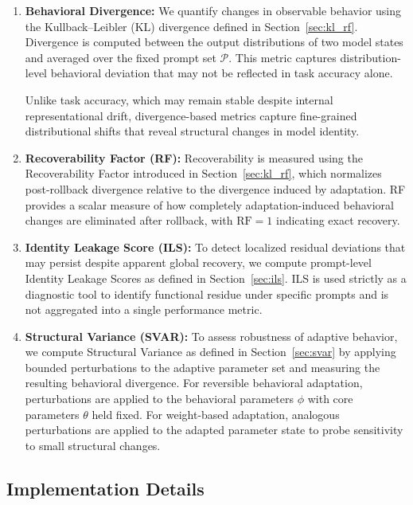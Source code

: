 \documentclass[10pt]{article}
\begin{document}
	\begin{enumerate}
		\item \textbf{Behavioral Divergence:}
		We quantify changes in observable behavior using the Kullback--Leibler (KL) divergence defined in Section~\ref{sec:kl_rf}. Divergence is computed between the output distributions of two model states and averaged over the fixed prompt set $\mathcal{P}$. This metric captures distribution-level behavioral deviation that may not be reflected in task accuracy alone.
		
		Unlike task accuracy, which may remain stable despite internal representational drift, divergence-based metrics capture fine-grained distributional shifts that reveal structural changes in model identity.
		\item \textbf{Recoverability Factor (RF):}
		Recoverability is measured using the Recoverability Factor introduced in Section~\ref{sec:kl_rf}, which normalizes post-rollback divergence relative to the divergence induced by adaptation. RF provides a scalar measure of how completely adaptation-induced behavioral changes are eliminated after rollback, with $\mathrm{RF}=1$ indicating exact recovery.
		\item \textbf{Identity Leakage Score (ILS):}
		To detect localized residual deviations that may persist despite apparent global recovery, we compute prompt-level Identity Leakage Scores as defined in Section~\ref{sec:ils}. ILS is used strictly as a diagnostic tool to identify functional residue under specific prompts and is not aggregated into a single performance metric.
		\item \textbf{Structural Variance (SVAR):}
		To assess robustness of adaptive behavior, we compute Structural Variance as defined in Section~\ref{sec:svar} by applying bounded perturbations to the adaptive parameter set and measuring the resulting behavioral divergence. For reversible behavioral adaptation, perturbations are applied to the behavioral parameters $\phi$ with core parameters $\theta$ held fixed. For weight-based adaptation, analogous perturbations are applied to the adapted parameter state to probe sensitivity to small structural changes.
	\end{enumerate}
	
	\newpage
	
	\subsection{Implementation Details}
	\label{sec:implementation_details}
	
\end{document}
